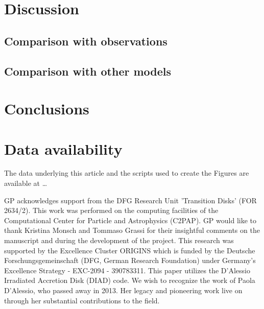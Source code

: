 \documentclass{aa}
\begin{document}
   \section{Discussion}\label{sec:discussion}

      \subsection{Comparison with observations}

      \subsection{Comparison with other models}

   \section{Conclusions}\label{sec:conclusions}

   \section{Data availability}
      The data underlying this article and the scripts used to create the Figures are available at \ldots

   \begin{appendix}

   \end{appendix}

   \begin{acknowledgements}
      GP acknowledges support from the DFG Research Unit 'Transition Disks' (FOR 2634/2).
      This work was performed on the computing facilities of the Computational Center for Particle and Astrophysics (C2PAP).
      GP would like to thank Kristina Monsch and Tommaso Grassi for their insightful comments on the manuscript and during the development of the project.
      This research was supported by the Excellence Cluster ORIGINS which is funded by the Deutsche Forschungsgemeinschaft (DFG,  German Research Foundation) under Germany's Excellence Strategy - EXC-2094 - 390783311.
      This paper utilizes the D'Alessio Irradiated Accretion Disk (DIAD) code. We wish to recognize the work of Paola D'Alessio, who passed away in 2013. Her legacy and pioneering work live on through her substantial contributions to the field.
   \end{acknowledgements}

   
\end{document}
